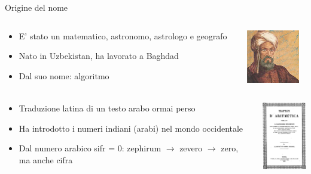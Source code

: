 \begin{frame}[shrink=5]{Origine del nome}
	
\vspace{-12pt}
\begin{columns}[T]
\begin{column}{0.80\textwidth}	
\begin{myboxtitle}
\medskip
\begin{itemize}
\item E' stato un matematico, astronomo, astrologo e geografo 
\item Nato in Uzbekistan, ha lavorato a Baghdad
\item Dal suo nome: \alert{algoritmo}
\end{itemize}
\end{myboxtitle}
\end{column}
\begin{column}{0.18\textwidth}	
\begin{center}
\includegraphics[width=2.3cm]{alkhavarizmi.jpg}
\end{center}
\end{column}
\end{columns}


\begin{overprint}

\begin{columns}[T]

\begin{myboxtitle}
\begin{itemize}
\item Traduzione latina di un testo arabo ormai perso
\item Ha introdotto i numeri indiani (arabi) nel mondo occidentale
\item Dal numero arabico \alert{sifr} = 0: zephirum $\rightarrow$ zevero $\rightarrow$ zero, ma anche cifra
\end{itemize}
\end{myboxtitle}

\begin{center}
\includegraphics[width=2.3cm]{indorum.jpg}
\end{center}
\end{columns}


\end{overprint}
\end{frame}

